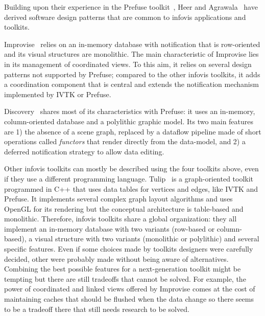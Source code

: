 Building upon their experience in the Prefuse toolkit~\cite{Prefuse},
Heer and Agrawala~\cite{DesignPatternsIV} have derived software design
patterns that are common to infovis applications and
toolkits. 

Improvise~\cite{Improvise} relies on an in-memory database with
notification that is row-oriented and its visual structures are
monolithic.  The main characteristic of Improvise lies in its
management of coordinated views.  To this aim, it relies on several
design patterns not supported by Prefuse; compared to the other
infovis toolkits, it adds a coordination component
that is central and extends the notification mechanism implemented
by IVTK or Prefuse.

Discovery~\cite{Discovery1,Discovery2,Discovery3} shares most of its
characteristics with Prefuse: it uses an in-memory, column-oriented
database and a polylithic graphic model. Its two main features are 1)
the absence of a scene graph, replaced by a dataflow pipeline made of
short operations called \emph{functors} that render directly from the
data-model, and 2) a deferred notification strategy to allow data
editing.


Other infovis toolkits can mostly be described using the four toolkits
above, even if they use a different programming language.
Tulip~\cite{Tulip} is a graph-oriented toolkit programmed in C++ that
uses data tables for vertices and edges, like IVTK and Prefuse.  It
implements several complex graph layout algorithms and uses OpenGL for
its rendering but the conceptual architecture is table-based and
monolithic.  Therefore, infovis toolkits share a
global organization: they all implement an in-memory database with two
variants (row-based or column-based), a visual structure with two
variants (monolithic or polylithic) and several specific features.
Even if some choices made by toolkits designers were carefully
decided, other were probably made without being aware of alternatives.
Combining the best possible features for a next-generation toolkit
might be tempting but there are still tradeoffs that cannot be solved.
For example, the power of coordinated and linked views offered by
Improvise comes at the cost of maintaining caches that should be
flushed when the data change so there seems to be a tradeoff there
that still needs research to be solved.

